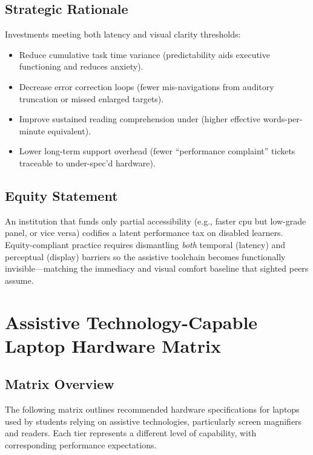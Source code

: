 \subsection*{Strategic Rationale}

Investments meeting both latency and visual clarity thresholds:
\begin{itemize}
	\item Reduce cumulative task time variance (predictability aids executive functioning and reduces anxiety).
	\item Decrease error correction loops (fewer mis-navigations from auditory truncation or missed enlarged targets).
	\item Improve sustained reading comprehension under  (higher effective words-per-minute equivalent).
	\item Lower long-term support overhead (fewer “performance complaint” tickets traceable to under-spec’d hardware).
\end{itemize}

\subsection*{Equity Statement}

An institution that funds only partial accessibility (e.g., faster \gls{cpu} but low-grade panel, or vice versa) codifies a latent performance tax on disabled learners. Equity-compliant practice requires dismantling \emph{both} temporal (latency) and perceptual (display) barriers so the assistive toolchain becomes functionally invisible—matching the immediacy and visual comfort baseline that sighted peers assume.

\section{Assistive Technology-Capable Laptop Hardware Matrix}\label{sec:assistive-laptop-matrix-magnification}

\subsection*{Matrix Overview}

The following matrix outlines recommended hardware specifications for laptops used by students relying on assistive technologies, particularly screen magnifiers and readers. Each tier represents a different level of capability, with corresponding performance expectations.

